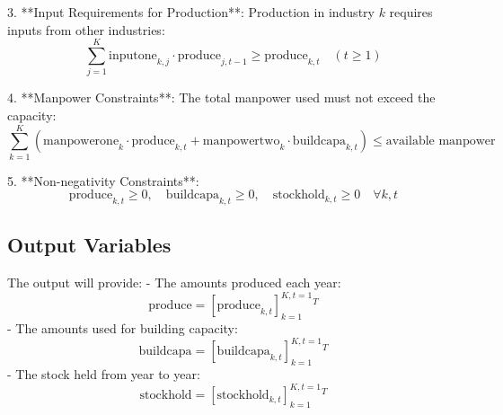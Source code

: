 \documentclass{article}
\begin{document}
3. **Input Requirements for Production**:
   Production in industry \( k \) requires inputs from other industries:
   \[
   \sum_{j=1}^{K} \text{inputone}_{k,j} \cdot \text{produce}_{j,t-1} \geq \text{produce}_{k,t} \quad (t \geq 1)
   \]

4. **Manpower Constraints**:
   The total manpower used must not exceed the capacity:
   \[
   \sum_{k=1}^{K} \left( \text{manpowerone}_{k} \cdot \text{produce}_{k,t} + \text{manpowertwo}_{k} \cdot \text{buildcapa}_{k,t} \right) \leq \text{available manpower}
   \]

5. **Non-negativity Constraints**:
   \[
   \text{produce}_{k,t} \geq 0, \quad \text{buildcapa}_{k,t} \geq 0, \quad \text{stockhold}_{k,t} \geq 0 \quad \forall k, t
   \]

\subsection*{Output Variables}
The output will provide:
- The amounts produced each year: 
\[
\text{produce} = \left[ \text{produce}_{k,t} \right]_{k=1}^{K, t=1}^{T}
\]
- The amounts used for building capacity:
\[
\text{buildcapa} = \left[ \text{buildcapa}_{k,t} \right]_{k=1}^{K, t=1}^{T}
\]
- The stock held from year to year:
\[
\text{stockhold} = \left[ \text{stockhold}_{k,t} \right]_{k=1}^{K, t=1}^{T}
\]
\end{document}
